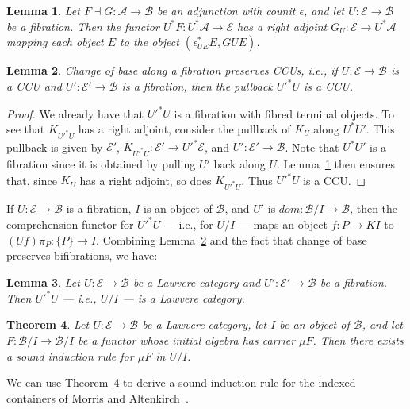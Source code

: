 \documentclass{LMCS}
\newcommand{\ra}{\rightarrow}
\newcommand\E{{\mathcal E}}
\newcommand\B{{\mathcal B}}
\newcommand\A{{\mathcal A}}
\theoremstyle{plain}
\newtheorem{theorem}{Theorem}[section]
\newtheorem{lemma}[theorem]{Lemma}
\theoremstyle{remark}
\theoremstyle{definition}
\begin{document}
\begin{lemma}\label{lem:claudio}
  Let $F \dashv G:\A \ra \B$ be an adjunction with counit $\epsilon$,
  and let $U:\E \ra \B$ be a fibration. Then the functor $U^*F:U^*\A
  \ra \E$ has a right adjoint $G_U:\E \ra U^*\A$ mapping each object
  $E$ to the object $(\epsilon_{UE}^* E, G U E)$.
\end{lemma}

\begin{lemma}\label{lem:pb-pres}
  Change of base along a fibration preserves CCUs, i.e., if $U:\E \ra
  \B$ is a CCU and $U': \E' \ra \B$ is a fibration, then the pullback
  $U'^*U$ is a CCU.
\end{lemma}
\begin{proof}
  We already have that $U'^*U$ is a fibration with fibred terminal
  objects. To see that $K_{U'^*U}$ has a right adjoint, consider the
  pullback of $K_U$ along $U^*U'$.  This pullback is given by $\E'$,
  $K_{U'^*U} : \E' \ra U'^*\E$, and $U' : \E' \ra \B$. Note that
  $U^*U'$ is a fibration since it is obtained by pulling $U'$ back
  along $U$. Lemma~\ref{lem:claudio} then ensures that, since $K_U$
  has a right adjoint, so does $K_{U'^*U}$. Thus $U'^*U$ is a CCU.
\end{proof}

If $U : \E \to \B$ is a fibration, $I$ is an object of $\B$, and $U'$
is $\mathit{dom} : \B/I \to \B$, then the comprehension functor for
$U'^*U$ --- i.e., for $U/I$ --- maps an object $f:P \ra KI$ to $(Uf)
\pi_P : \{P\} \to I$. Combining Lemma~\ref{lem:pb-pres} and the fact
that change of base preserves bifibrations, we have:

\begin{lemma}\label{lem:coblwfib}
  Let $U:\E \ra \B$ be a Lawvere category and $U':\E' \ra \B$ be a
  fibration. Then $U'^*U$ --- i.e., $U/I$ --- is a Lawvere category.
\end{lemma}
\noindent

\begin{theorem}\label{thm:iinda}
Let $U : \E \to \B$ be a Lawvere category, let $I$ be an object of
$\B$, and let $F : \B/I \to \B/I$ be a functor whose initial algebra
has carrier $\mu F$. Then there exists a sound induction rule for $\mu
F$ in $U/I$.
\end{theorem}

We can use Theorem~\ref{thm:iinda} to derive a sound induction rule
for the indexed containers of Morris and Altenkirch~\cite{ma09}.
\end{document}
